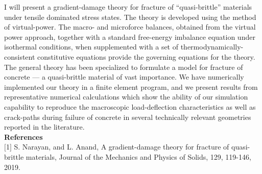 I will present a gradient-damage theory for fracture of “quasi-brittle” materials under tensile dominated stress states. The theory is developed using the method of virtual-power. The macro- and microforce balances, obtained from the virtual power approach, together with a standard free-energy imbalance equation under isothermal conditions, when supplemented with a set of thermodynamically-consistent constitutive equations provide the governing equations for the theory. The general theory has been specialized to formulate a model for fracture of concrete --- a quasi-brittle material of vast importance. We have numerically implemented our theory in a finite element program, and we present results from representative numerical calculations which show the ability of our simulation capability to reproduce the macroscopic load-deflection characteristics as well as crack-paths during failure of concrete in several technically relevant geometries reported in the literature.\\

\noindent\textbf{References}\\
$[$1$]$ S. Narayan, and L. Anand, A gradient-damage theory for fracture of quasi-brittle materials, Journal of the Mechanics and Physics of Solids, 129, 119-146, 2019.
